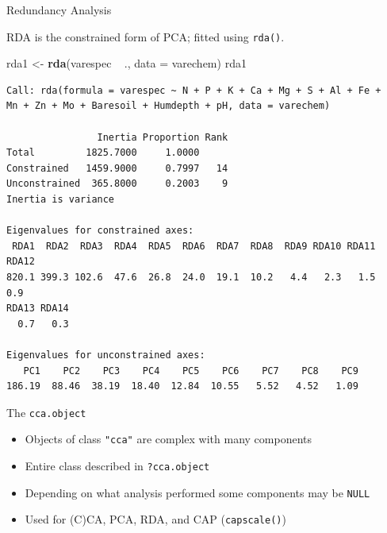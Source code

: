 \documentclass[10pt,ignorenonframetext,compress, aspectratio=169]{beamer}
\newenvironment{Shaded}{\begin{snugshade}}{\end{snugshade}}
\newcommand{\KeywordTok}[1]{\textcolor[rgb]{0.13,0.29,0.53}{\textbf{{#1}}}}
\newcommand{\DataTypeTok}[1]{\textcolor[rgb]{0.13,0.29,0.53}{{#1}}}
\newcommand{\StringTok}[1]{\textcolor[rgb]{0.31,0.60,0.02}{{#1}}}
\newcommand{\NormalTok}[1]{{#1}}
\begin{document}
\begin{frame}[fragile]{Redundancy Analysis}

RDA is the constrained form of PCA; fitted using \texttt{rda()}.

\tiny

\begin{Shaded}
\begin{Highlighting}[]
\NormalTok{rda1 <-}\StringTok{ }\KeywordTok{rda}\NormalTok{(varespec ~}\StringTok{ }\NormalTok{., }\DataTypeTok{data =} \NormalTok{varechem)}
\NormalTok{rda1}
\end{Highlighting}
\end{Shaded}

\begin{verbatim}
Call: rda(formula = varespec ~ N + P + K + Ca + Mg + S + Al + Fe +
Mn + Zn + Mo + Baresoil + Humdepth + pH, data = varechem)

                Inertia Proportion Rank
Total         1825.7000     1.0000     
Constrained   1459.9000     0.7997   14
Unconstrained  365.8000     0.2003    9
Inertia is variance 

Eigenvalues for constrained axes:
 RDA1  RDA2  RDA3  RDA4  RDA5  RDA6  RDA7  RDA8  RDA9 RDA10 RDA11 RDA12 
820.1 399.3 102.6  47.6  26.8  24.0  19.1  10.2   4.4   2.3   1.5   0.9 
RDA13 RDA14 
  0.7   0.3 

Eigenvalues for unconstrained axes:
   PC1    PC2    PC3    PC4    PC5    PC6    PC7    PC8    PC9 
186.19  88.46  38.19  18.40  12.84  10.55   5.52   4.52   1.09 
\end{verbatim}

\normalsize

\end{frame}

\begin{frame}{The \texttt{cca.object}}

\begin{itemize}
\itemsep1pt\parskip0pt
\item
  Objects of class \texttt{"cca"} are complex with many components
\item
  Entire class described in \texttt{?cca.object}
\item
  Depending on what analysis performed some components may be
  \texttt{NULL}
\item
  Used for (C)CA, PCA, RDA, and CAP (\texttt{capscale()})
\end{itemize}

\end{frame}
\end{document}
